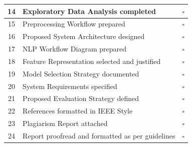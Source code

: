 \begin{table}[H]
\begin{tabular}{|c|p{10cm}|c|}
14 & Exploratory Data Analysis completed & $\square$ \\ \hline

15 & Preprocessing Workflow prepared & $\square$ \\ \hline

16 & Proposed System Architecture designed & $\square$ \\ \hline

17 & NLP Workflow Diagram prepared & $\square$ \\ \hline

18 & Feature Representation selected and justified & $\square$ \\ \hline

19 & Model Selection Strategy documented & $\square$ \\ \hline

20 & System Requirements specified & $\square$ \\ \hline

21 & Proposed Evaluation Strategy defined & $\square$ \\ \hline

22 & References formatted in IEEE Style & $\square$ \\ \hline

23 & Plagiarism Report attached & $\square$ \\ \hline

24 & Report proofread and formatted as per guidelines & $\square$ \\ \hline

\end{tabular}
\end{table}